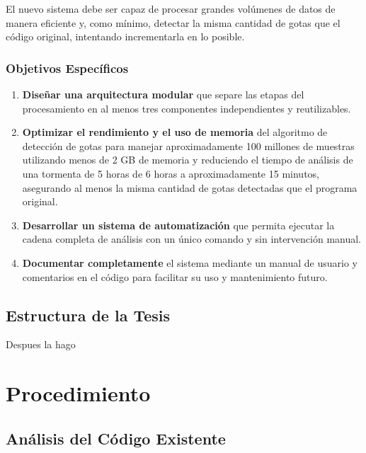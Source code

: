 \documentclass[12pt,a4paper]{article}
\begin{document}
El nuevo sistema debe ser capaz de procesar grandes volúmenes de datos de manera eficiente y, como mínimo, detectar la misma cantidad de gotas que el código original, intentando incrementarla en lo posible.

\subsubsection{Objetivos Específicos}

\begin{enumerate}
    \item \textbf{Diseñar una arquitectura modular} que separe las etapas del procesamiento en al menos tres componentes independientes y reutilizables.

    \item \textbf{Optimizar el rendimiento y el uso de memoria} del algoritmo de detección de gotas para manejar aproximadamente 100 millones de muestras utilizando menos de 2 GB de memoria y reduciendo el tiempo de análisis de una tormenta de 5 horas de 6 horas a aproximadamente 15 minutos, asegurando al menos la misma cantidad de gotas detectadas que el programa original.

    \item \textbf{Desarrollar un sistema de automatización} que permita ejecutar la cadena completa de análisis con un único comando y sin intervención manual.

    \item \textbf{Documentar completamente} el sistema mediante un manual de usuario y comentarios en el código para facilitar su uso y mantenimiento futuro.
\end{enumerate}

\subsection{Estructura de la Tesis}
\lhead{}

Despues la hago

\section{Procedimiento}
\lhead{}

\subsection{Análisis del Código Existente}
\lhead{}
\end{document}

